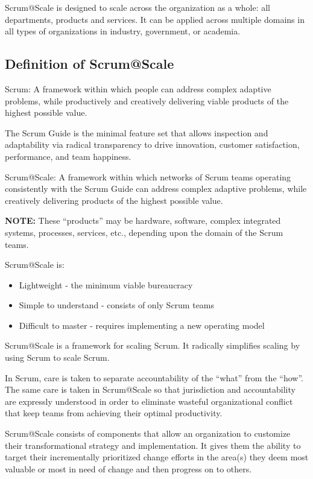 \documentclass[12pt,a4paper,parskip=full]{scrartcl}
\begin{document}
Scrum@Scale is designed to scale across the organization as a whole: all
departments, products and services. It can be applied across multiple
domains in all types of organizations in industry, government, or academia.

\subsection{Definition of Scrum@Scale}
Scrum: A framework within which people can address complex adaptive
problems, while productively and creatively delivering viable products of the
highest possible value.

The Scrum Guide is the minimal feature set that allows inspection and
adaptability via radical transparency to drive innovation, customer satisfaction, performance, and
team happiness.

Scrum@Scale: A framework within which networks of Scrum teams operating
consistently with the Scrum Guide can address complex adaptive problems,
while creatively delivering products of the highest possible value.

\textbf{NOTE:} These ``products'' may be hardware, software, complex
integrated systems, processes, services, etc., depending upon the domain of
the Scrum teams.

Scrum@Scale is:
\begin{itemize}
\item Lightweight - the minimum viable bureaucracy
\item Simple to understand - consists of only Scrum teams
\item Difficult to master - requires implementing a new operating model
\end{itemize}


Scrum@Scale is a framework for scaling Scrum. It radically simplifies
scaling by using Scrum to scale Scrum. 

In Scrum, care is taken to separate accountability of the ``what'' from the
``how''. The same care is taken in Scrum@Scale so that jurisdiction and
accountability are expressly understood in order to eliminate wasteful
organizational conflict that keep teams from achieving their optimal
productivity.

Scrum@Scale consists of components that allow an organization to
customize their transformational strategy and implementation. It gives them
the ability to target their incrementally prioritized change efforts in the area(s) they deem
most valuable or most in need of change and then progress on to others.
\end{document}
